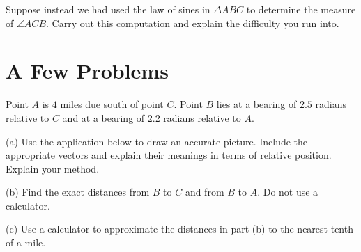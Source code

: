 \documentclass{ximera}
\begin{document}
\begin{example}
\begin{explanation}
\begin{question}  \label{Qertr452}
Suppose instead we had used the law of sines in $\Delta ABC$ to determine the measure of $\angle ACB$. Carry out this computation and explain the difficulty you run into.
\end{question}

\end{explanation}

\end{example}


\section{A Few Problems}

\begin{question}  \label{Qwereduy764}
Point $A$ is $4$ miles due south of point $C$. Point $B$ lies at a bearing of $2.5$ radians relative to $C$ and at a bearing of $2.2$ radians relative to $A$.

(a) Use the application below to draw an accurate picture. Include the appropriate vectors and explain their meanings in terms of relative position. Explain your method.

(b) Find the exact distances from $B$ to $C$ and from $B$ to $A$. Do not use a calculator.

(c) Use a calculator to approximate the distances in part (b) to the nearest tenth of a mile.

 
\begin{onlineOnly}
    \begin{center}
\end{center}
\end{onlineOnly}
\end{question}
\end{document}
